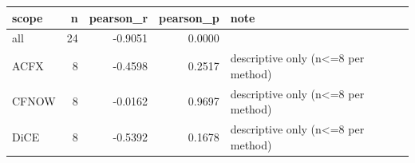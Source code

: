 \begin{tabular}{lrrrl}
\toprule
scope &  n &  pearson\_r &  pearson\_p &                               note \\
\midrule
  all & 24 &    -0.9051 &     0.0000 &                                    \\
 ACFX &  8 &    -0.4598 &     0.2517 & descriptive only (n<=8 per method) \\
CFNOW &  8 &    -0.0162 &     0.9697 & descriptive only (n<=8 per method) \\
 DiCE &  8 &    -0.5392 &     0.1678 & descriptive only (n<=8 per method) \\
\bottomrule
\end{tabular}
